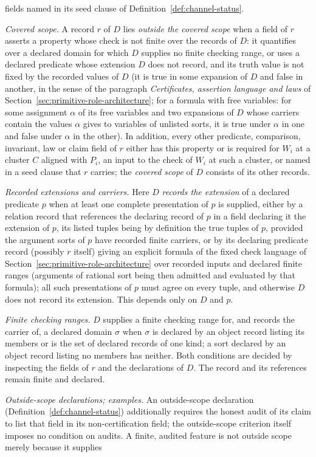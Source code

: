 fields named in its seed clause of Definition~\ref{def:channel-status}. \par\noindent\emph{Covered scope.} A record \(r\) of \(D\) lies \emph{outside the covered scope} when a field of \(r\) asserts a property whose check is not finite over the records of \(D\): it quantifies over a declared domain for which \(D\) supplies no finite checking range, or uses a declared predicate whose extension \(D\) does not record, and its truth value is not fixed by the recorded values of \(D\) (it is true in some expansion of \(D\) and false in another, in the sense of the paragraph \emph{Certificates, assertion language and laws} of Section~\ref{sec:primitive-role-architecture}; for a formula with free variables: for some assignment \(\alpha\) of its free variables and two expansions of \(D\) whose carriers contain the values \(\alpha\) gives to variables of unlisted sorts, it is true under \(\alpha\) in one and false under \(\alpha\) in the other). In addition, every other predicate, comparison, invariant, law or claim field of \(r\) either has this property or is required for \(W_i\) at a cluster \(C\) aligned with \(P_i\), an input to the check of \(W_i\) at such a cluster, or named in a seed clause that \(r\) carries; the \emph{covered scope} of \(D\) consists of its other records. \par\noindent\emph{Recorded extensions and carriers.} Here \(D\) \emph{records the extension} of a declared predicate \(p\) when at least one complete presentation of \(p\) is supplied, either by a relation record that references the declaring record of \(p\) in a field declaring it the extension of \(p\), its listed tuples being by definition the true tuples of \(p\), provided the argument sorts of \(p\) have recorded finite carriers, or by its declaring predicate record (possibly \(r\) itself) giving an explicit formula of the fixed check language of Section~\ref{sec:primitive-role-architecture} over recorded inputs and declared finite ranges (arguments of rational sort being then admitted and evaluated by that formula); all such presentations of \(p\) must agree on every tuple, and otherwise \(D\) does not record its extension. This depends only on \(D\) and \(p\).\par\noindent\emph{Finite checking ranges.} \(D\) supplies a finite
checking range for, and records the carrier of, a declared domain \(\sigma\)
when \(\sigma\) is declared by an object record listing its members or is the
set of declared records of one kind; a sort declared by an object record
listing no members has neither. Both conditions are decided by inspecting the fields of \(r\) and the declarations of \(D\). The record and its references remain finite and declared. \par\noindent\emph{Outside-scope declarations; examples.} An outside-scope declaration (Definition~\ref{def:channel-status}) additionally requires the honest audit of its claim to list that field in its non-certification field; the outside-scope criterion itself imposes no condition on audits. A finite, audited feature is not outside scope merely because it supplies
